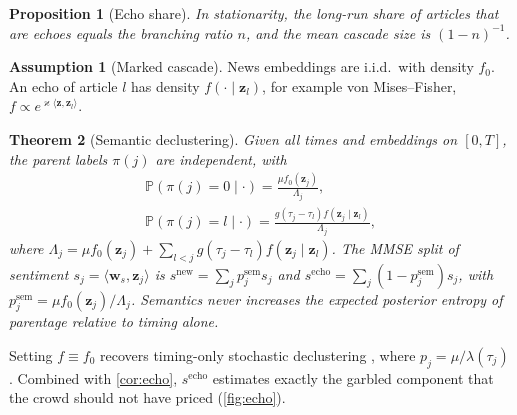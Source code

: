 \documentclass[10pt,twocolumn,letterpaper]{article}
\theoremstyle{plain}
\newtheorem{theorem}{Theorem}
\newtheorem{proposition}[theorem]{Proposition}
\theoremstyle{definition}
\newtheorem{assumption}{Assumption}
\theoremstyle{remark}
\newcommand{\Prob}{\mathbb{P}}
\newcommand{\z}{\bm{z}}
\newcommand{\w}{\bm{w}}
\begin{document}
\begin{proposition}[Echo share]\label{prop:branching}
In stationarity, the long-run share of articles that are echoes equals the branching ratio $n$, and the mean cascade size is $(1-n)^{-1}$.
\end{proposition}

\begin{assumption}[Marked cascade]\label{ass:marked}
News embeddings are i.i.d.\ with density $f_0$. An echo of article $l$ has density $f(\cdot\mid\z_l)$, for example von Mises--Fisher, $f\propto e^{\varkappa\langle\z,\z_l\rangle}$.
\end{assumption}

\begin{theorem}[Semantic declustering]\label{thm:semantic}
Given all times and embeddings on $[0,T]$, the parent labels $\pi(j)$ are independent, with
\begin{gather*}
  \Prob(\pi(j)=0\mid\cdot)=\frac{\mu f_0(\z_j)}{\Lambda_j},\\
  \Prob(\pi(j)=l\mid\cdot)=\frac{g(\tau_j-\tau_l)f(\z_j\mid\z_l)}{\Lambda_j},
\end{gather*}
where $\Lambda_j=\mu f_0(\z_j)+\sum_{l<j}g(\tau_j-\tau_l)f(\z_j\mid\z_l)$. The MMSE split of sentiment $s_j=\langle\w_s,\z_j\rangle$ is $s^{\mathrm{new}}=\sum_jp^{\mathrm{sem}}_js_j$ and $s^{\mathrm{echo}}=\sum_j(1-p^{\mathrm{sem}}_j)s_j$, with $p^{\mathrm{sem}}_j=\mu f_0(\z_j)/\Lambda_j$. Semantics never increases the expected posterior entropy of parentage relative to timing alone.
\end{theorem}

Setting $f\equiv f_0$ recovers timing-only stochastic declustering \citep{zhuang2002}, where $p_j=\mu/\lambda(\tau_j)$. Combined with \cref{cor:echo}, $s^{\mathrm{echo}}$ estimates exactly the garbled component that the crowd should not have priced (\cref{fig:echo}).
\end{document}
